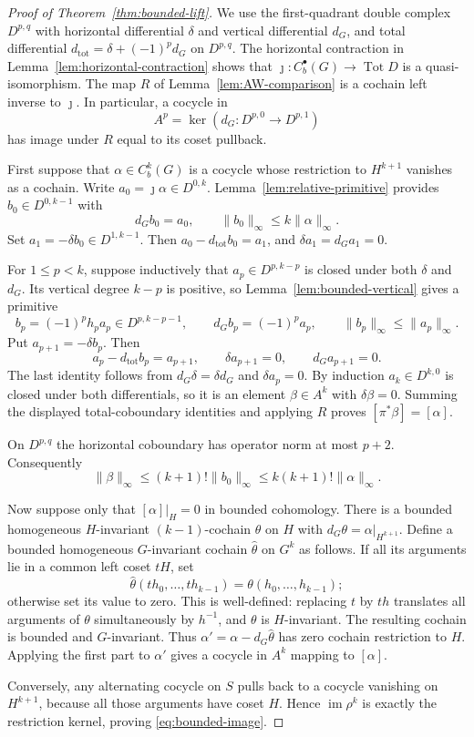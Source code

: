 \begin{proof}[Proof of Theorem~\ref{thm:bounded-lift}]
We use the first-quadrant double complex
$D^{p,q}$ with horizontal differential
$\delta$ and vertical differential $d_G$, and
total differential $d_{\mathrm{tot}}=
\delta+(-1)^pd_G$ on $D^{p,q}$.
The horizontal contraction in
Lemma~\ref{lem:horizontal-contraction}
shows that $\jmath:C_b^\bullet(G)\to
\operatorname{Tot}D$ is a quasi-isomorphism.
The map $R$ of Lemma~\ref{lem:AW-comparison}
is a cochain left inverse to $\jmath$.
In particular, a cocycle in
\[
 A^p=\ker(d_G:D^{p,0}\to D^{p,1})
\]
has image under $R$ equal to its coset
pullback.

First suppose that $\alpha\in C_b^k(G)$
is a cocycle whose restriction to $H^{k+1}$
vanishes as a cochain. Write
$a_0=\jmath\alpha\in D^{0,k}$.
Lemma~\ref{lem:relative-primitive}
provides $b_0\in D^{0,k-1}$ with
\[
 d_Gb_0=a_0,\qquad
 \|b_0\|_\infty\leq k\|\alpha\|_\infty.
\]
Set $a_1=-\delta b_0\in D^{1,k-1}$.
Then $a_0-d_{\mathrm{tot}}b_0=a_1$,
and $\delta a_1=d_Ga_1=0$.

For $1\leq p<k$, suppose inductively
that $a_p\in D^{p,k-p}$ is closed under
both $\delta$ and $d_G$. Its vertical
degree $k-p$ is positive, so
Lemma~\ref{lem:bounded-vertical}
gives a primitive
\[
 b_p=(-1)^ph_pa_p\in D^{p,k-p-1},
 \qquad d_Gb_p=(-1)^pa_p,
 \qquad \|b_p\|_\infty\leq\|a_p\|_\infty.
\]
Put $a_{p+1}=-\delta b_p$. Then
\[
 a_p-d_{\mathrm{tot}}b_p=a_{p+1},
 \qquad
 \delta a_{p+1}=0,
 \qquad
 d_Ga_{p+1}=0.
\]
The last identity follows from
$d_G\delta=\delta d_G$ and
$\delta a_p=0$. By induction
$a_k\in D^{k,0}$ is closed under
both differentials, so it is an element
$\beta\in A^k$ with $\delta\beta=0$.
Summing the displayed total-coboundary
identities and applying $R$ proves
$[\pi^*\beta]=[\alpha]$.

On $D^{p,q}$ the horizontal coboundary
has operator norm at most $p+2$.
Consequently
\[
 \|\beta\|_\infty
 \leq (k+1)!\|b_0\|_\infty
 \leq k(k+1)!\|\alpha\|_\infty.
\]

Now suppose only that
$[\alpha]|_H=0$ in bounded cohomology.
There is a bounded homogeneous
$H$-invariant $(k-1)$-cochain
$\theta$ on $H$ with
$d_G\theta=\alpha|_{H^{k+1}}$.
Define a bounded homogeneous
$G$-invariant cochain $\widehat\theta$
on $G^k$ as follows. If all its
arguments lie in a common left coset
$tH$, set
\[
 \widehat\theta(th_0,\ldots,th_{k-1})
    =\theta(h_0,\ldots,h_{k-1});
\]
otherwise set its value to zero.
This is well-defined: replacing $t$
by $th$ translates all arguments
of $\theta$ simultaneously by $h^{-1}$,
and $\theta$ is $H$-invariant.
The resulting cochain is bounded
and $G$-invariant. Thus
$\alpha'=\alpha-d_G\widehat\theta$
has zero cochain restriction to $H$.
Applying the first part to $\alpha'$
gives a cocycle in $A^k$ mapping to
$[\alpha]$.

Conversely, any alternating cocycle on
$S$ pulls back to a cocycle vanishing
on $H^{k+1}$, because all those
arguments have coset $H$. Hence
$\operatorname{im}\rho^k$ is exactly
the restriction kernel, proving
\eqref{eq:bounded-image}.
\end{proof}

